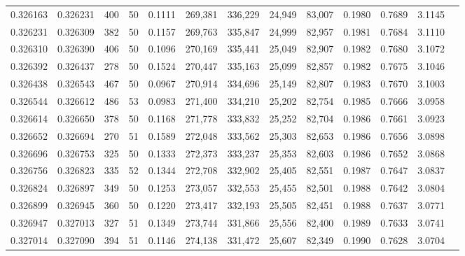 \begin{tabular}{rrrrrrrrrrrrr}
0.326163 & 0.326231 &   400 &  50 &                                     0.1111 & 269,381 & 336,229 &  24,949 &  83,007 & 0.1980 & 0.7689 & 3.1145 \\
0.326231 & 0.326309 &   382 &  50 &                                     0.1157 & 269,763 & 335,847 &  24,999 &  82,957 & 0.1981 & 0.7684 & 3.1110 \\
0.326310 & 0.326390 &   406 &  50 &                                     0.1096 & 270,169 & 335,441 &  25,049 &  82,907 & 0.1982 & 0.7680 & 3.1072 \\
0.326392 & 0.326437 &   278 &  50 &                                     0.1524 & 270,447 & 335,163 &  25,099 &  82,857 & 0.1982 & 0.7675 & 3.1046 \\
0.326438 & 0.326543 &   467 &  50 &                                     0.0967 & 270,914 & 334,696 &  25,149 &  82,807 & 0.1983 & 0.7670 & 3.1003 \\
0.326544 & 0.326612 &   486 &  53 &                                     0.0983 & 271,400 & 334,210 &  25,202 &  82,754 & 0.1985 & 0.7666 & 3.0958 \\
0.326614 & 0.326650 &   378 &  50 &                                     0.1168 & 271,778 & 333,832 &  25,252 &  82,704 & 0.1986 & 0.7661 & 3.0923 \\
0.326652 & 0.326694 &   270 &  51 &                                     0.1589 & 272,048 & 333,562 &  25,303 &  82,653 & 0.1986 & 0.7656 & 3.0898 \\
0.326696 & 0.326753 &   325 &  50 &                                     0.1333 & 272,373 & 333,237 &  25,353 &  82,603 & 0.1986 & 0.7652 & 3.0868 \\
0.326756 & 0.326823 &   335 &  52 &                                     0.1344 & 272,708 & 332,902 &  25,405 &  82,551 & 0.1987 & 0.7647 & 3.0837 \\
0.326824 & 0.326897 &   349 &  50 &                                     0.1253 & 273,057 & 332,553 &  25,455 &  82,501 & 0.1988 & 0.7642 & 3.0804 \\
0.326899 & 0.326945 &   360 &  50 &                                     0.1220 & 273,417 & 332,193 &  25,505 &  82,451 & 0.1988 & 0.7637 & 3.0771 \\
0.326947 & 0.327013 &   327 &  51 &                                     0.1349 & 273,744 & 331,866 &  25,556 &  82,400 & 0.1989 & 0.7633 & 3.0741 \\
0.327014 & 0.327090 &   394 &  51 &                                     0.1146 & 274,138 & 331,472 &  25,607 &  82,349 & 0.1990 & 0.7628 & 3.0704 \\

\end{tabular}

